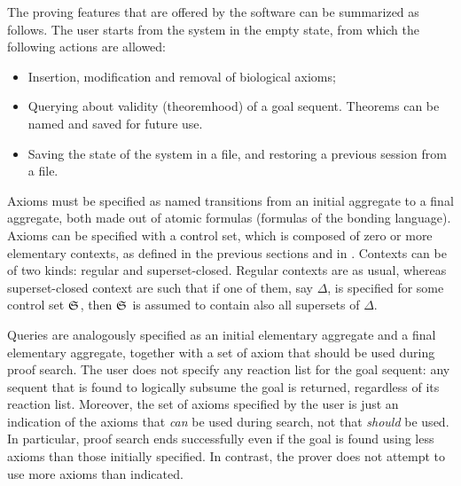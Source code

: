 The proving features that are offered by the software can be summarized as
follows. The user starts from the system in the empty state, from which the
following actions are allowed:

\begin{itemize}
\item Insertion, modification and removal of biological axioms;
\item Querying about validity (theoremhood) of a goal sequent.
  Theorems can be named and saved for future use.
\item Saving the state of the system in a file, and restoring a previous session
  from a file.
\end{itemize}

Axioms must be specified as named transitions from an initial aggregate to a
final aggregate, both made out of atomic formulas (formulas of the bonding
language). Axioms can be specified with a control set, which is composed of zero
or more elementary contexts, as defined in the previous sections and in
\cite{adding-logic}. Contexts can be of two kinds: regular and superset-closed.
Regular contexts are as usual, whereas superset-closed context are such that if
one of them, say $\Delta$, is specified for some control set $\mathfrak{S}_{}$, then
$\mathfrak{S}_{}$ is assumed to contain also all supersets of $\Delta$.

Queries are analogously specified as an initial elementary aggregate and a final
elementary aggregate, together with a set of axiom that should be used during
proof search. The user does not specify any reaction list for the goal
sequent: any sequent that is found to logically subsume the goal is returned,
regardless of its reaction list.
Moreover, the set of axioms specified by the user is just an indication of the
axioms that \emph{can} be used during search, not that \emph{should} be used. In
particular, proof search ends successfully even if the goal is found using less
axioms than those initially specified. In contrast, the prover does not attempt
to use more axioms than indicated.

